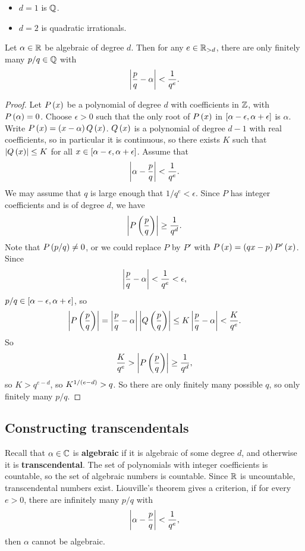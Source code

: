 \begin{example2}
\hfill
\begin{itemize}
\item $ d = 1 $ is $ \Q $.
\item $ d = 2 $ is quadratic irrationals.
\end{itemize}
\end{example2}

\begin{theorem}
Let $ \alpha \in \R $ be algebraic of degree $ d $. Then for any $ e \in \R_{> d} $, there are only finitely many $ p / q \in \Q $ with
$$ \abs{\dfrac{p}{q} - \alpha} < \dfrac{1}{q^e}. $$
\end{theorem}

\begin{proof}
Let $ P\rb{x} $ be a polynomial of degree $ d $ with coefficients in $ \Z $, with $ P\rb{\alpha} = 0 $. Choose $ \epsilon > 0 $ such that the only root of $ P\rb{x} $ in $ \sb{\alpha - \epsilon, \alpha + \epsilon} $ is $ \alpha $. Write $ P\rb{x} = \rb{x - \alpha}Q\rb{x} $. $ Q\rb{x} $ is a polynomial of degree $ d - 1 $ with real coefficients, so in particular it is continuous, so there exists $ K $ such that $ \abs{Q\rb{x}} \le K $ for all $ x \in \sb{\alpha - \epsilon, \alpha + \epsilon} $. Assume that
$$ \abs{\alpha - \dfrac{p}{q}} < \dfrac{1}{q^e}. $$
We may assume that $ q $ is large enough that $ 1 / q^e < \epsilon $. Since $ P $ has integer coefficients and is of degree $ d $, we have
$$ \abs{P\rb{\dfrac{p}{q}}} \ge \dfrac{1}{q^d}. $$
Note that $ P\rb{p / q} \ne 0 $, or we could replace $ P $ by $ P' $ with $ P\rb{x} = \rb{qx - p}P'\rb{x} $. Since
$$ \abs{\dfrac{p}{q} - \alpha} < \dfrac{1}{q^e} < \epsilon, $$
$ p / q \in \sb{\alpha - \epsilon, \alpha + \epsilon} $, so
$$ \abs{P\rb{\dfrac{p}{q}}} = \abs{\dfrac{p}{q} - \alpha} \abs{Q\rb{\dfrac{p}{q}}} \le K \abs{\dfrac{p}{q} - \alpha} < \dfrac{K}{q^e}. $$
So
$$ \dfrac{K}{q^e} > \abs{P\rb{\dfrac{p}{q}}} \ge \dfrac{1}{q^d}, $$
so $ K > q^{e - d} $, so $ K^{1 / \rb{e - d}} > q $. So there are only finitely many possible $ q $, so only finitely many $ p / q $.
\end{proof}

\subsection{Constructing transcendentals}

Recall that $ \alpha \in \C $ is \textbf{algebraic} if it is algebraic of some degree $ d $, and otherwise it is \textbf{transcendental}. The set of polynomials with integer coefficients is countable, so the set of algebraic numbers is countable. Since $ \R $ is uncountable, transcendental numbers exist. Liouville's theorem gives a criterion, if for every $ e > 0 $, there are infinitely many $ p / q $ with
$$ \abs{\alpha - \dfrac{p}{q}} < \dfrac{1}{q^e}, $$
then $ \alpha $ cannot be algebraic.

